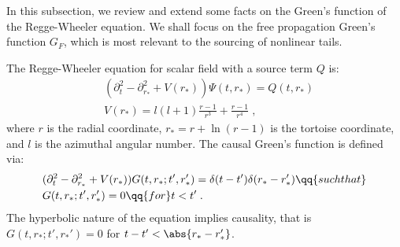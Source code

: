 \label{sec:G_analytical_approximation}
In this subsection, we review and extend some facts on the Green's function of the Regge-Wheeler equation.
We shall focus on the free propagation Green's function $G_F$, which is most relevant to the sourcing of nonlinear tails.


The Regge-Wheeler equation for scalar field with a source term $Q$ is:
\begin{align}
  \label{eq:rw_equation_with_source}
  & (\partial_t^2 - \partial_{r_*}^2 +V(r_*)) \Psi(t,r_*) =  Q(t,r_*) \nonumber \\
  & V(r_*) = l (l+1) \frac{r-1}{r^3} + \frac{r-1}{r^4} \;,
\end{align}
where $r$ is the radial coordinate, $r_* = r + \ln(r - 1)$ is the tortoise coordinate, and $l$ is the azimuthal angular number.
The causal Green's function is defined via:
\begin{align}
  \label{eq:green_function_definition}
  & (\partial_t^2 - \partial_{r_*}^2 + V(r_*)) G(t,r_*;t',r_*') =  \delta(t-t') \delta(r_*-r_*') \qq{such that} \nonumber \\
  & G(t,r_*;t',r_*') = 0 \qq{for} t < t' \;.
\end{align}
The hyperbolic nature of the equation implies causality, that is $G(t,r_*;t',r_*')=0$ for $t-t' < \abs{r_*-r_*'}$.


